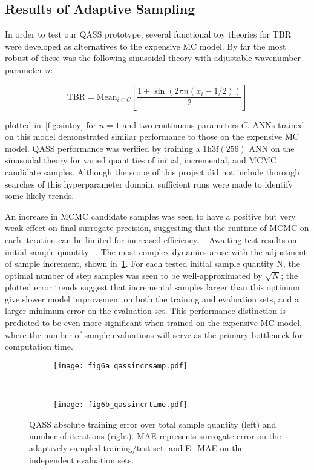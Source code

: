 \subsection{Results of Adaptive Sampling}
\label{sec:adaptiveres}

In order to test our QASS prototype, several functional toy theories for TBR were developed as alternatives to the expensive MC model. By far the most robust of these was the following sinusoidal theory with adjustable wavenumber parameter $n$:

\begin{equation}
	\text{TBR} = \text{Mean}_{i \in C} \left[ \frac{1 + \sin(2\pi n (x_i - 1/2)) }{2} \right]
\end{equation}

plotted in~\cref{fig:sintoy} for $n=1$ and two continuous parameters $C$. ANNs
trained on this model demonstrated similar performance to those on the expensive
MC model. QASS performance was verified by training a $\text{1h3f}(256)$ ANN on
the sinusoidal theory for varied quantities of initial, incremental, and MCMC
candidate samples. Although the scope of this project did not include thorough
searches of this hyperparameter domain, sufficient runs were made to identify
some likely trends.

An increase in MCMC candidate samples was seen to have a positive but very weak
effect on final surrogate precision, suggesting that the runtime of MCMC on each
iteration can be limited for increased efficiency. -- Awaiting test results on
initial sample quantity --. The most complex dynamics arose with the adjustment
of sample increment, shown in~\cref{fig:qassincr}. For each tested initial sample quantity N, the optimal number of step samples was seen to be well-approximated by $\sqrt{N}$; the plotted error trends suggest that incremental samples larger than this optimum give slower model improvement on both the training and evaluation sets, and a larger minimum error on the evaluation set. This performance distinction is predicted to be even more significant when trained on the expensive MC model, where the number of sample evaluations will serve as the primary bottleneck for computation time.
\begin{figure}[h!]
    \centering
    \begin{subfigure}[t]{0.5\textwidth}
        \centering
        \texttt{[image: fig6a\_qassincrsamp.pdf]}
    \end{subfigure}%
    ~ 
    \begin{subfigure}[t]{0.5\textwidth}
        \centering
        \texttt{[image: fig6b\_qassincrtime.pdf]}
    \end{subfigure}
    \caption{QASS absolute training error over total sample quantity (left) and number of iterations (right). MAE represents surrogate error on the adaptively-sampled training/test set, and E\_MAE on the independent evaluation sets.}
    \label{fig:qassincr}
\end{figure}


